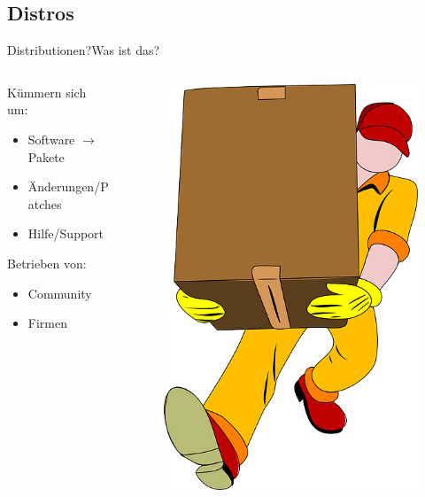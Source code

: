 \subsection{Distros}
\begin{frame}{Distributionen?}{Was ist das?}
\begin{columns}
\begin{column}{0.45\textwidth}

Kümmern sich um:  
\begin{itemize}
 \item Software $\longrightarrow$ Pakete
 \item Änderungen/Patches
 \item Hilfe/Support 
\end{itemize}
 Betrieben von: 
\begin{itemize}
 \item Community
 \item Firmen
\end{itemize}
 \end{column}
\begin{column}{0.4\textwidth}
 \begin{figure}
 \includegraphics[height=0.5\textheight]{resources/movers-24402_640.png}

\end{figure}
\end{column}
\end{columns}
\end{frame}
